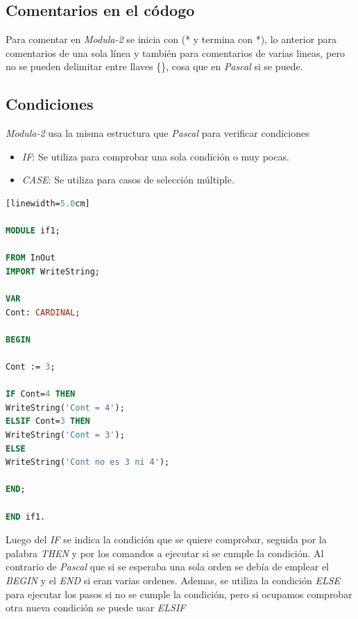 \documentclass[10pt,journal,compsoc]{IEEEtran}
\begin{document}
\subsection{Comentarios en el c\'odogo}
Para comentar en \emph{Modula-2} se inicia con (* y termina con *), lo anterior para comentarios de una sola l\'inea y tambi\'en para comentarios de varias lineas, pero no se pueden delimitar entre llaves \{\}, cosa que en \emph{Pascal} si se puede.

\subsection{Condiciones}
\emph{Modula-2} usa la misma estructura que \emph{Pascal} para verificar condiciones
\begin{itemize}
	\item \emph{IF}: Se utiliza para comprobar una sola condici\'on o muy pocas.
	\item \emph{CASE}: Se utiliza para casos de selecci\'on m\'ultiple.
\end{itemize}
\begin{lstlisting}[language=Modula-2, caption = {Sintaxis de un IF}][linewidth=5.0cm]

MODULE if1;

FROM InOut 
IMPORT WriteString;

VAR 
Cont: CARDINAL;

BEGIN

Cont := 3;

IF Cont=4 THEN 
WriteString('Cont = 4'); 
ELSIF Cont=3 THEN 
WriteString('Cont = 3'); 
ELSE 
WriteString('Cont no es 3 ni 4');

END;

END if1. 

\end{lstlisting}

Luego del \emph{IF} se indica la condici\'on que se quiere comprobar, seguida por la palabra \emph{THEN} y por los comandos a ejecutar si se cumple la condici\'on. Al contrario de \emph{Pascal} que si se esperaba una sola orden se deb\'ia de emplear el \emph{BEGIN} y el \emph{END} si eran varias ordenes. Ademas, se utiliza la condici\'on \emph{ELSE} para ejecutar los pasos si no se cumple la condici\'on, pero si ocupamos comprobar otra nueva condici\'on se puede usar \emph{ELSIF}
\end{document}
